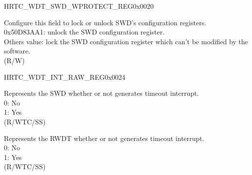 \begin{register}{H}{RTC\_WDT\_SWD\_WPROTECT\_REG}{0x0020}\label{regdesc:RTCWDTSWDWPROTECTREG}
%
\regnewline%
\begin{regdesc}\begin{reglist}
\label{fielddesc:RTCWDTSWDWKEY}\item [RTC\_WDT\_SWD\_WKEY] Configure this field to lock or unlock SWD's configuration registers.\\
0x50D83AA1: unlock the SWD configuration register. \\
Others value: lock the SWD configuration register which can't be modified by the software.\\
 (R/W)
\end{reglist}\end{regdesc}
\end{register}


\begin{register}{H}{RTC\_WDT\_INT\_RAW\_REG}{0x0024}\label{regdesc:RTCWDTINTRAWREG}
%
%
%
\regnewline%
\begin{regdesc}\begin{reglist}
\label{fielddesc:RTCWDTSUPERWDTINTRAW}\item [RTC\_WDT\_SWD\_INT\_RAW] Represents the SWD whether or not generates timeout interrupt.\\
0: No \\
1: Yes  \\ (R/WTC/SS)
\label{fielddesc:RTCWDTINTRAW}\item [RTC\_WDT\_INT\_RAW] Represents the RWDT whether or not generates timeout interrupt.\\
0: No \\
1: Yes  \\ (R/WTC/SS)
\end{reglist}\end{regdesc}
\end{register}


